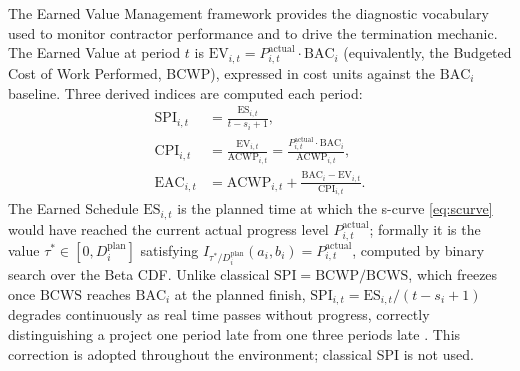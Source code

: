 The Earned Value Management framework \citep{Fleming2010} provides the
diagnostic vocabulary used to monitor contractor performance and to drive
the termination mechanic. The Earned Value at period $t$ is
$\mathrm{EV}_{i,t} = P_{i,t}^{\mathrm{actual}} \cdot \mathrm{BAC}_i$
(equivalently, the Budgeted Cost of Work Performed, BCWP), expressed in
cost units against the $\mathrm{BAC}_i$ baseline. Three derived indices
are computed each period:
\begin{align}
  \mathrm{SPI}_{i,t}
    &= \frac{\mathrm{ES}_{i,t}}{t - s_i + 1},
  \label{eq:SPI} \\
  \mathrm{CPI}_{i,t}
    &= \frac{\mathrm{EV}_{i,t}}{\mathrm{ACWP}_{i,t}}
     = \frac{P_{i,t}^{\mathrm{actual}} \cdot \mathrm{BAC}_i}
            {\mathrm{ACWP}_{i,t}},
  \label{eq:CPI} \\
  \mathrm{EAC}_{i,t}
    &= \mathrm{ACWP}_{i,t}
       + \frac{\mathrm{BAC}_i - \mathrm{EV}_{i,t}}{\mathrm{CPI}_{i,t}}.
  \label{eq:EAC}
\end{align}
The Earned Schedule $\mathrm{ES}_{i,t}$ is the planned time at which the
s-curve \eqref{eq:scurve} would have reached the current actual progress
level $P_{i,t}^{\mathrm{actual}}$; formally it is the value
$\tau^* \in [0, D_i^{\mathrm{plan}}]$ satisfying
$I_{\tau^*/D_i^{\mathrm{plan}}}(a_i, b_i) = P_{i,t}^{\mathrm{actual}}$,
computed by binary search over the Beta CDF.
Unlike classical $\mathrm{SPI} = \mathrm{BCWP}/\mathrm{BCWS}$, which
freezes once $\mathrm{BCWS}$ reaches $\mathrm{BAC}_i$ at the planned
finish, $\mathrm{SPI}_{i,t} = \mathrm{ES}_{i,t}/(t - s_i + 1)$ degrades
continuously as real time passes without progress, correctly distinguishing
a project one period late from one three periods late \citep{Lipke2003}.
This correction is adopted throughout the environment; classical SPI is
not used.


